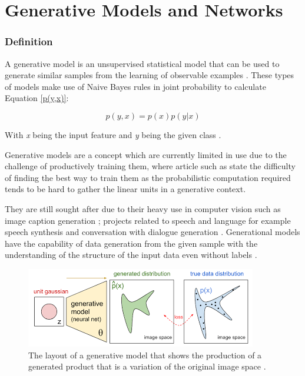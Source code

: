 \chapter{Generative Models and Networks}
\label{ch:Generative Models and Networks}

\subsection{Definition}
A generative model is an unsupervised statistical model that can be used to generate similar samples from the learning of observable examples \citet{shin:2017}.
These types of models make use of Naive Bayes rules in joint probability to calculate Equation \ref{p(y,x)}:

\begin{equation}\label{p(y,x)}
p(y,x) = p(x)p(y|x)
\end{equation}

With \textit{x} being the input feature and \textit{y} being the given class \citet{ng:2002}.

Generative models are a concept which are currently limited in use due to the challenge of productively training them, 
where article such as \citet{goodfellow:2014} state the difficulty of 
finding the best way to train them as the probabilistic computation required tends to be hard to gather the linear units in a generative context.



They are still sought after due to their heavy use in computer vision such as image caption generation \citet{lin:2014,touretzky:1996}; projects related to speech and language for example speech synthesis \citet{ou:2012} and conversation with dialogue generation \citet{sordoni:2015}. Generational models have the capability of data generation from the given sample with the understanding of the structure of the input data even without labels \citet{tu:2007}.


\begin{figure}
  \centering
  \includegraphics[width=1\linewidth]{graphics/generational_models/gm.png}

  \caption[Caption for GAN]{The layout of a generative model that shows the production of a generated product that is a variation of the original image space \protect\footnotemark. }
  \label{fig:GN}
\end{figure}
